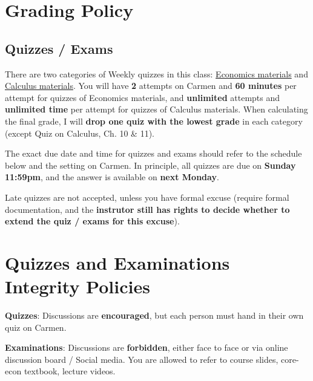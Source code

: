 \documentclass[12pt]{article}
\begin{document}
\section*{Grading Policy}

\subsection*{Quizzes / Exams}

There are two categories of Weekly quizzes in this class: \underline{Economics materials} and \underline{Calculus materials}.
You will have \textbf{2} attempts on Carmen and \textbf{60 minutes} per attempt for quizzes of Economics materials, and \textbf{unlimited} attempts and \textbf{unlimited time} per attempt for quizzes of Calculus materials. When calculating the final grade, I will \textbf{drop one quiz with the lowest grade} in each category (except Quiz on Calculus, Ch. 10 \& 11).

The exact due date and time for quizzes and exams should refer to the schedule below and the setting on Carmen.
In principle, all quizzes are due on \textbf{Sunday 11:59pm}, and the answer is available on \textbf{next Monday}.

Late quizzes are not accepted, unless you have formal excuse (require formal documentation, and the \textbf{instrutor still has rights to decide whether to extend the quiz / exams for this excuse}).

\section*{Quizzes and Examinations Integrity Policies}

\textbf{Quizzes}: Discussions are \textbf{encouraged}, but each person must hand in their own quiz on Carmen.

\textbf{Examinations}: Discussions are \textbf{forbidden}, either face to face or via online discussion board / Social media. You are allowed to refer to course slides, core-econ textbook, lecture videos.


\end{document}
